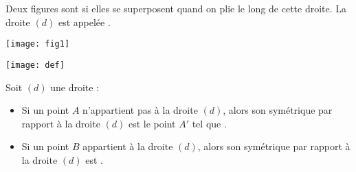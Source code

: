 \begin{mydef}
	Deux figures sont  si elles se superposent quand on plie le long de cette droite. 
	La droite $(d)$ est appelée \kw{\hspace*{5cm}}.

\end{mydef}




\begin{myex}
	\begin{center}
		\texttt{[image: fig1]}
	\end{center}	
\end{myex}

\begin{multicols}{2}
	
	\begin{center}
		\texttt{[image: def]}
	\end{center}
	
	\begin{myprops}
		Soit $(d)$ une droite :
		\begin{itemize}
			\item Si un point $A$ n'appartient pas à la droite $(d)$, alors son symétrique par rapport à la droite $(d)$ est le point $A'$ tel que  \hspace*{5cm}.
			\item Si un point $B$ appartient à la droite $(d)$, alors son symétrique par rapport à la droite $(d)$ est \hspace*{4cm}.
		\end{itemize}
	\end{myprops}
	
	
\end{multicols}
